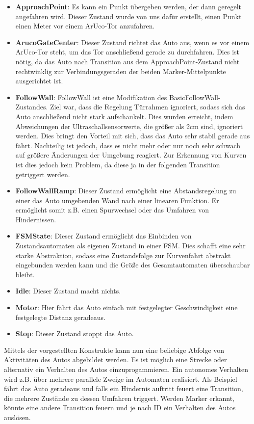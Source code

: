 \begin{itemize}
	\item \textbf{ApproachPoint}: Es kann ein Punkt übergeben werden, der dann geregelt angefahren wird. Dieser Zustand wurde von uns dafür erstellt, einen Punkt einen Meter vor einem ArUco-Tor anzufahren.
	\item \textbf{ArucoGateCenter}: Dieser Zustand richtet das Auto aus, wenn es vor einem ArUco-Tor steht, um das Tor anschließend gerade zu durchfahren. Dies ist nötig, da das Auto nach Transition aus dem ApproachPoint-Zustand nicht rechtwinklig zur Verbindungsgeraden der beiden Marker-Mittelpunkte ausgerichtet ist.
	\item \textbf{FollowWall}: FollowWall ist eine Modifikation des BasicFollowWall-Zustandes. Ziel war, dass die Regelung Türrahmen ignoriert, sodass sich das Auto anschließend nicht stark aufschaukelt. Dies wurden erreicht, indem Abweichungen der Ultraschallsensorwerte, die größer als 2cm sind, ignoriert werden. Dies bringt den Vorteil mit sich, dass das Auto sehr stabil gerade aus fährt. Nachteilig ist jedoch, dass es nicht mehr oder nur noch sehr schwach auf größere Änderungen der Umgebung reagiert. Zur Erkennung von Kurven ist dies jedoch kein Problem, da diese ja in der folgenden Transition getriggert werden.
	\item \textbf{FollowWallRamp}: Dieser Zustand ermöglicht eine Abstandsregelung zu einer das Auto umgebenden Wand nach einer linearen Funktion. Er ermöglicht somit z.B. einen Spurwechsel oder das Umfahren von Hindernissen.
	\item \textbf{FSMState}: Dieser Zustand ermöglicht das Einbinden von Zustandsautomaten als eigenen Zustand in einer FSM. Dies schafft eine sehr starke Abstraktion, sodass eine Zustandsfolge zur Kurvenfahrt abstrakt eingebunden werden kann und die Größe des Gesamtautomaten überschaubar bleibt.
	\item \textbf{Idle}: Dieser Zustand macht nichts. 
	\item \textbf{Motor}: Hier fährt das Auto einfach mit festgelegter Geschwindigkeit eine festgelegte Distanz geradeaus.
	\item \textbf{Stop}: Dieser Zustand stoppt das Auto.
\end{itemize}
Mittels der vorgestellten Konstrukte kann nun eine beliebige Abfolge von Aktivitäten des Autos abgebildet werden. Es ist möglich eine Strecke oder alternativ ein Verhalten des Autos einzuprogammieren. Ein autonomes Verhalten wird z.B. über mehrere parallele Zweige im Automaten realisiert. Als Beispiel fährt das Auto geradeaus und falls ein Hindernis auftritt feuert eine Transition, die mehrere Zustände zu dessen Umfahren triggert. Werden Marker erkannt, könnte eine andere Transition feuern und je nach ID ein Verhalten des Autos auslösen.

